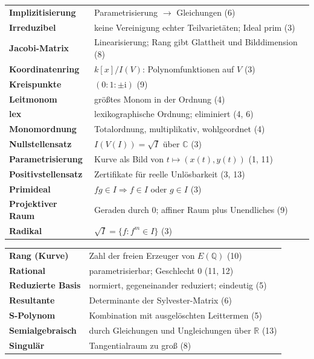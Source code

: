 \begin{merksatz}
\begin{center}
{\begin{tabular}{@{}P{3.4cm}P{5.2cm}@{}}
\textbf{Implizitisierung} & Parametrisierung $\to$ Gleichungen (6)\\
\textbf{Irreduzibel} & keine Vereinigung echter Teilvarietäten; Ideal prim (3)\\
\textbf{Jacobi-Matrix} & Linearisierung; Rang gibt Glattheit und Bilddimension (8)\\
\textbf{Koordinatenring} & $k[x]/I(V)$: Polynomfunktionen auf $V$ (3)\\
\textbf{Kreispunkte} & $(0 : 1 : \pm\mathrm i)$ (9)\\
\textbf{Leitmonom} & größtes Monom in der Ordnung (4)\\
\textbf{lex} & lexikographische Ordnung; eliminiert (4, 6)\\
\textbf{Monomordnung} & Totalordnung, multiplikativ, wohlgeordnet (4)\\
\textbf{Nullstellensatz} & $I(V(I)) = \sqrt I$ über $\mathbb C$ (3)\\
\textbf{Parametrisierung} & Kurve als Bild von $t\mapsto(x(t), y(t))$ (1, 11)\\
\textbf{Positivstellensatz} & Zertifikate für reelle Unlösbarkeit (3, 13)\\
\textbf{Primideal} & $fg\in I\Rightarrow f\in I$ oder $g\in I$ (3)\\
\textbf{Projektiver Raum} & Geraden durch $0$; affiner Raum plus Unendliches (9)\\
\textbf{Radikal} & $\sqrt I = \{f : f^{m}\in I\}$ (3)\\
\bottomrule
\end{tabular}}
\end{center}
\begin{center}
{\small
\renewcommand{\arraystretch}{1.42}
\begin{tabular}{@{}P{3.4cm}P{5.2cm}@{}}
\toprule
\textbf{Rang (Kurve)} & Zahl der freien Erzeuger von $E(\mathbb Q)$ (10)\\
\textbf{Rational} & parametrisierbar; Geschlecht $0$ (11, 12)\\
\textbf{Reduzierte Basis} & normiert, gegeneinander reduziert; eindeutig (5)\\
\textbf{Resultante} & Determinante der Sylvester-Matrix (6)\\
\textbf{S-Polynom} & Kombination mit ausgelöschten Leittermen (5)\\
\textbf{Semialgebraisch} & durch Gleichungen und Ungleichungen über $\mathbb R$ (13)\\
\textbf{Singulär} & Tangentialraum zu groß (8)\\

\end{tabular}}
\end{center}
\end{merksatz}
